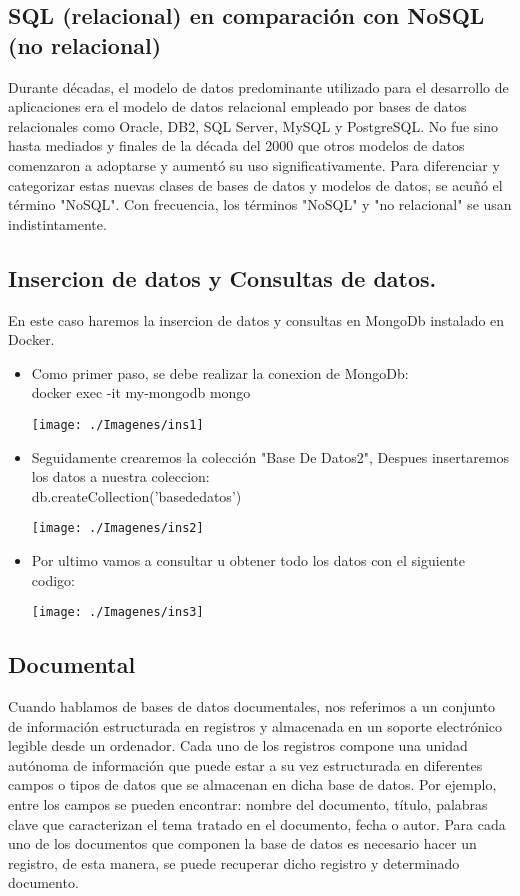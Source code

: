 \documentclass[twoside,twocolumn]{article}
\begin{document}
\subsection{SQL (relacional) en comparación con NoSQL (no relacional)}

Durante décadas, el modelo de datos predominante utilizado para el desarrollo de aplicaciones era el modelo de datos relacional empleado por bases de datos relacionales como Oracle, DB2, SQL Server, MySQL y PostgreSQL. No fue sino hasta mediados y finales de la década del 2000 que otros modelos de datos comenzaron a adoptarse y aumentó su uso significativamente. Para diferenciar y categorizar estas nuevas clases de bases de datos y modelos de datos, se acuñó el término "NoSQL". Con frecuencia, los términos "NoSQL" y "no relacional" se usan indistintamente.



\subsection{Insercion de datos y Consultas de datos.}
En este caso haremos la insercion de datos y consultas en MongoDb instalado en Docker.
\begin{itemize}
\item Como primer paso, se debe realizar la conexion de MongoDb:\\
docker exec -it my-mongodb mongo
\begin{center}
	\texttt{[image: ./Imagenes/ins1]} 
	\end{center}
\item Seguidamente crearemos la colección "Base De Datos2", Despues insertaremos los datos a nuestra coleccion:\\
db.createCollection('basededatos')  
\begin{center}
	\texttt{[image: ./Imagenes/ins2]} 
	\end{center}

\item Por ultimo vamos a consultar u obtener todo los datos con el siguiente codigo:\\

\begin{center}
	\texttt{[image: ./Imagenes/ins3]} 
	\end{center}
\end{itemize} 
\subsection{Documental}
Cuando hablamos de bases de datos documentales, nos referimos a un conjunto de información estructurada en registros y almacenada en un soporte electrónico legible desde un ordenador. Cada uno de los registros compone una unidad autónoma de información que puede estar a su vez estructurada en diferentes campos o tipos de datos que se almacenan en dicha base de datos. Por ejemplo, entre los campos se pueden encontrar: nombre del documento, título, palabras clave que caracterizan el tema tratado en el documento, fecha o autor. Para cada uno de los documentos que componen la base de datos es necesario hacer un registro, de esta manera, se puede recuperar dicho registro y determinado documento.
\end{document}
